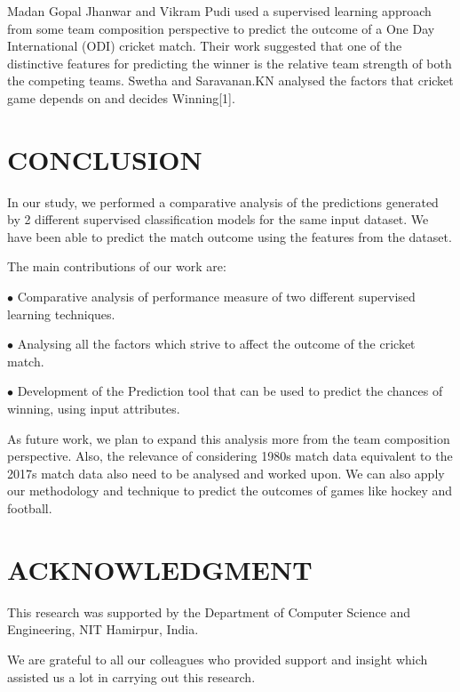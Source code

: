 \documentclass[a4paper, 10pt, conference]{IEEEtran}
\begin{document}
Madan Gopal Jhanwar and Vikram Pudi used a supervised learning approach from some team composition perspective to predict the outcome of a One Day International (ODI) cricket match. Their work suggested that one of the distinctive features for predicting the winner is the relative team strength of both the competing teams. Swetha and Saravanan.KN analysed the factors that cricket game depends on and decides Winning[1]. 


\section{CONCLUSION}

In our study, we performed a comparative analysis of the predictions generated by 2 different supervised classification models for the same input dataset. We have been able to predict the match outcome using the features from the dataset. 

The main contributions of our work are:
\begin{description}
  \item$\bullet$ Comparative analysis of performance measure of two different supervised learning techniques. 
  \item$\bullet$ Analysing all the factors which strive to affect the outcome of the cricket match.
  \item$\bullet$ Development of the Prediction tool that can be used to predict the chances of winning, using input attributes.
\end{description}

As future work, we plan to expand this analysis more from the team composition perspective. Also, the relevance of considering 1980s match data equivalent to the 2017s match data also need to be analysed and worked upon. We can also apply our methodology and technique to predict the outcomes of games like hockey and football.

\section{ACKNOWLEDGMENT}

This research was supported by the Department of Computer Science and Engineering, NIT Hamirpur, India.

We are grateful to all our colleagues who provided support and insight which assisted us a lot in carrying out this research.
  
\end{document}
